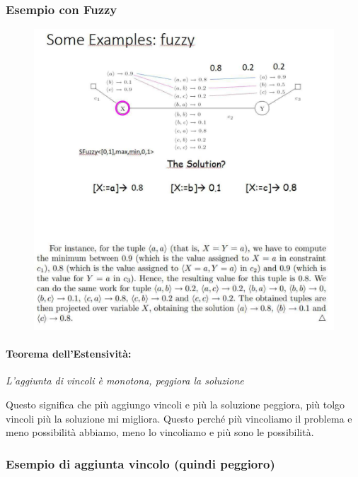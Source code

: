 \subsubsection{Esempio con Fuzzy}
\begin{figure}[htp]
    \centering
    \includegraphics[width=14cm, keepaspectratio]{img/Cap4/fuzzy.png}
\end{figure}

\newpage
\paragraph{Teorema dell'Estensività: }
\begin{center}
    \textit{L'aggiunta di vincoli è monotona, peggiora la soluzione}
\end{center}
Questo significa che più aggiungo vincoli e più la soluzione peggiora, più tolgo
vincoli più la soluzione mi migliora. Questo perché più vincoliamo il problema e
meno possibilità abbiamo, meno lo vincoliamo e più sono le possibilità.

\subsubsection{Esempio di aggiunta vincolo (quindi peggioro)}

